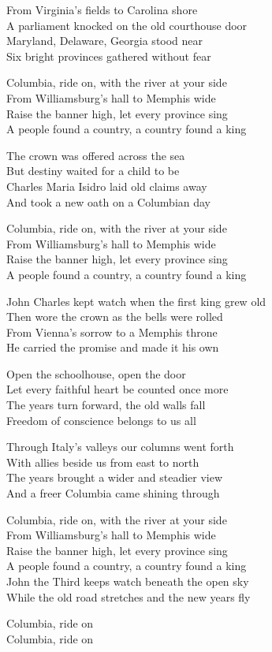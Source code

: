 \begin{lyrics}
From Virginia’s fields to Carolina shore\\
A parliament knocked on the old courthouse door\\
Maryland, Delaware, Georgia stood near\\
Six bright provinces gathered without fear

Columbia, ride on, with the river at your side\\
From Williamsburg’s hall to Memphis wide\\
Raise the banner high, let every province sing\\
A people found a country, a country found a king

The crown was offered across the sea\\
But destiny waited for a child to be\\
Charles Maria Isidro laid old claims away\\
And took a new oath on a Columbian day

Columbia, ride on, with the river at your side\\
From Williamsburg’s hall to Memphis wide\\
Raise the banner high, let every province sing\\
A people found a country, a country found a king

John Charles kept watch when the first king grew old\\
Then wore the crown as the bells were rolled\\
From Vienna’s sorrow to a Memphis throne\\
He carried the promise and made it his own

Open the schoolhouse, open the door\\
Let every faithful heart be counted once more\\
The years turn forward, the old walls fall\\
Freedom of conscience belongs to us all

Through Italy’s valleys our columns went forth\\
With allies beside us from east to north\\
The years brought a wider and steadier view\\
And a freer Columbia came shining through

Columbia, ride on, with the river at your side\\
From Williamsburg’s hall to Memphis wide\\
Raise the banner high, let every province sing\\
A people found a country, a country found a king\\
John the Third keeps watch beneath the open sky\\
While the old road stretches and the new years fly

Columbia, ride on\\
Columbia, ride on
\end{lyrics}

